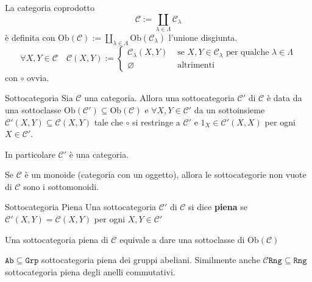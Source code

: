 \begin{example}
    La categoria coprodotto
    \[
      \mathcal{C} := \coprod_{\lambda \in \Lambda} \mathcal{C}_{\lambda} 
    \]
    è definita con \(\mathrm{Ob}{(\mathcal{C})} := \coprod_{\lambda \in \Lambda} \mathrm{Ob}{(\mathcal{C}_{\lambda} )}\) l'unione disgiunta. 
    \[
      \forall X, Y \in \mathcal{C} \quad \mathcal{C}{(X, Y)} := \begin{cases}{}
          \mathcal{C}_{\lambda} {(X, Y)} & \text{ se } X, Y \in \mathcal{C}_{\lambda} \text{ per
          qualche } \lambda \in \Lambda \\
              \varnothing & \text{ altrimenti}
      \end{cases}
    \]
    con \(\circ\) ovvia.
\end{example}

\begin{definition}{Sottocategoria}
    Sia \(\mathcal{C}\) una categoria. Allora una sottocategoria
    \(\mathcal{C}'\) di \(\mathcal{C}\) è data
    da una sottoclasse \(\mathrm{Ob}{(\mathcal{C}')} \subseteq
    \mathrm{Ob}{(\mathcal{C})} \) e \(\forall X, Y \in \mathcal{C}'\) da un
    sottoinsieme \(\mathcal{C}'{(X, Y)} \subseteq \mathcal{C}{(X, Y)} \) tale
    che \(\circ\) si restringe a \(\mathcal{C}'\) e \(1_X \in \mathcal{C}'{(X,
    X)}\) per ogni \(X \in \mathcal{C}'\).

    In particolare \(\mathcal{C}'\) è una categoria.
\end{definition}

\begin{example}{}
    Se \(\mathcal{C}\) è un monoide (categoria con un oggetto), allora le sottocategorie
    non vuote di \(\mathcal{C}\) sono i sottomonoidi.
\end{example}

\begin{definition}{Sottocategoria Piena}
    Una sottocategoria \(\mathcal{C}'\) di \(\mathcal{C}\) si dice \textbf{piena} se \(\mathcal{C}'{(X, Y)} =
    \mathcal{C}{(X, Y)}\) per ogni \(X, Y \in \mathcal{C}'\) 
\end{definition}

\begin{remark}{}
    Una sottocategoria piena di \(\mathcal{C}\) equivale a dare una sottoclasse di \(\mathrm{Ob}{(\mathcal{C})}\) 
\end{remark}

\begin{example}
    \(\mathtt{Ab} \subseteq \mathtt{Grp} \) sottocategoria piena dei gruppi
    abeliani. Similmente anche \(\mathtt{\mathcal{C}Rng} \subseteq \mathtt{Rng} \)
    sottocategoria piena degli anelli commutativi.
\end{example}

